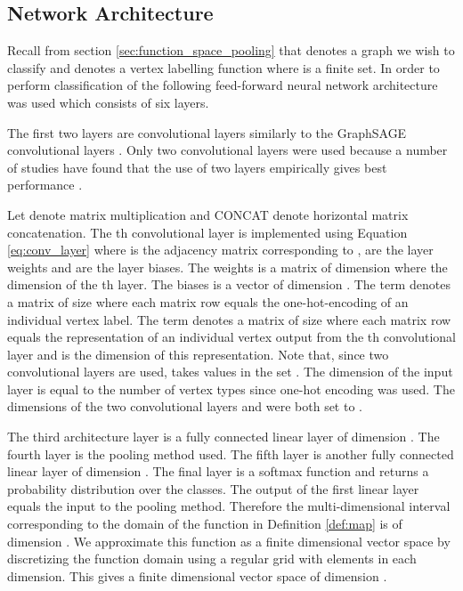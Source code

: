 \documentclass[runningheads]{llncs}
\begin{document}
\subsection{Network Architecture}
\label{sec:results:architecture}
Recall from section \ref{sec:function_space_pooling} that  denotes a graph we wish to classify and  denotes a vertex labelling function where  is a finite set. In order to perform classification of  the following feed-forward neural network architecture was used which consists of six layers.

The first two layers are convolutional layers similarly to the GraphSAGE convolutional layers \cite{hamilton2017}. Only two convolutional layers were used because a number of studies have found that the use of two layers empirically gives best performance \cite{kipf-welling-16}.

Let  denote matrix multiplication and CONCAT denote horizontal matrix concatenation. The th convolutional layer is implemented using Equation \ref{eq:conv_layer} where  is the adjacency matrix corresponding to ,  are the layer weights and  are the layer biases. The weights  is a matrix of dimension  where  the dimension of the th layer. The biases  is a vector of dimension . The term  denotes a matrix of size  where each matrix row equals the one-hot-encoding of an individual vertex label. The term  denotes a matrix of size  where each matrix row equals the representation of an individual vertex output from the th convolutional layer and  is the dimension of this representation. Note that, since two convolutional layers are used,  takes values in the set . The dimension of the input layer  is equal to the number of vertex types since one-hot encoding was used. The dimensions of the two convolutional layers  and  were both set to .



The third architecture layer is a fully connected linear layer of dimension . The fourth layer is the pooling method used. The fifth layer is another fully connected linear layer of dimension . The final layer is a softmax function and returns a probability distribution over the classes. The output of the first linear layer equals the input to the pooling method. Therefore the multi-dimensional interval corresponding to the domain of the function  in Definition \ref{def:map} is of dimension . We approximate this function as a finite dimensional vector space by discretizing the function domain using a regular grid with  elements in each dimension. This gives a finite dimensional vector space of dimension .
\end{document}
